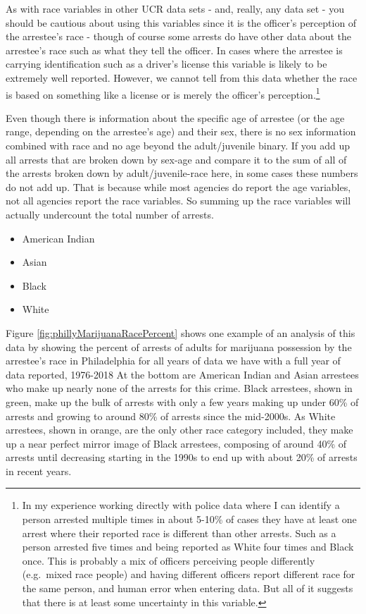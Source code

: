 \documentclass[
]{krantz}
\providecommand{\tightlist}{%
  \setlength{\itemsep}{0pt}\setlength{\parskip}{0pt}}
\begin{document}
As with race variables in other UCR data sets - and, really,
any data set - you should be cautious about using this
variables since it is the officer's perception of the
arrestee's race - though of course some arrests do have
other data about the arrestee's race such as what they tell
the officer. In cases where the arrestee is carrying
identification such as a driver's license this variable is
likely to be extremely well reported. However, we cannot
tell from this data whether the race is based on something
like a license or is merely the officer's
perception.\footnote{In my experience working directly with
  police data where I can identify a person arrested
  multiple times in about 5-10\% of cases they have at least
  one arrest where their reported race is different than
  other arrests. Such as a person arrested five times and
  being reported as White four times and Black once. This is
  probably a mix of officers perceiving people differently
  (e.g.~mixed race people) and having different officers
  report different race for the same person, and human error
  when entering data. But all of it suggests that there is
  at least some uncertainty in this variable.}

Even though there is information about the specific age of
arrestee (or the age range, depending on the arrestee's age)
and their sex, there is no sex information combined with
race and no age beyond the adult/juvenile binary. If you add
up all arrests that are broken down by sex-age and compare
it to the sum of all of the arrests broken down by
adult/juvenile-race here, in some cases these numbers do not
add up. That is because while most agencies do report the
age variables, not all agencies report the race variables.
So summing up the race variables will actually undercount
the total number of arrests.

\begin{itemize}
\tightlist
\item
  American Indian
\item
  Asian
\item
  Black
\item
  White
\end{itemize}

Figure \ref{fig:phillyMarijuanaRacePercent} shows one
example of an analysis of this data by showing the percent
of arrests of adults for marijuana possession by the
arrestee's race in Philadelphia for all years of data we
have with a full year of data reported, 1976-2018 At the
bottom are American Indian and Asian arrestees who make up
nearly none of the arrests for this crime. Black arrestees,
shown in green, make up the bulk of arrests with only a few
years making up under 60\% of arrests and growing to around
80\% of arrests since the mid-2000s. As White arrestees,
shown in orange, are the only other race category included,
they make up a near perfect mirror image of Black arrestees,
composing of around 40\% of arrests until decreasing
starting in the 1990s to end up with about 20\% of arrests
in recent years.
\end{document}
